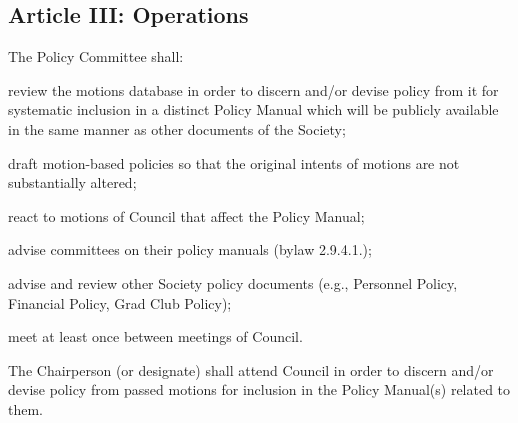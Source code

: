 \subsection{Article III: Operations}
\begin{longenum}[ label*=\thesubsection.\arabic*., align=left] 
\item The Policy Committee shall:
	\begin{longenum}[label*=\arabic*., align=left]
	\item review the motions database in order to discern and/or devise policy from it for systematic inclusion in a distinct Policy Manual which will be publicly available in the same manner as other documents of the Society;
	\item draft motion-based policies so that the original intents of motions are not substantially altered;
	\item react to motions of Council that affect the Policy Manual;
	\item advise committees on their policy manuals (bylaw 2.9.4.1.);
	\item advise and review other Society policy documents (e.g., Personnel Policy, Financial Policy, Grad Club Policy);	
	\item meet at least once between meetings of Council.
	\end{longenum}
\item The Chairperson (or designate) shall attend Council in order to discern and/or devise policy from passed motions for inclusion in the Policy Manual(s) related to them.
\end{longenum}














